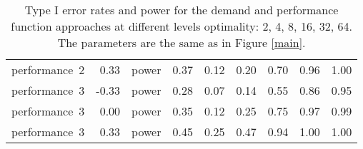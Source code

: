 \begin{table}[ht]
\begin{tabular}{lrlrrrrrr}
  performance~2 & 0.33 & power & 0.37 & 0.12 & 0.20 & 0.70 & 0.96 & 1.00 \\ 
  performance~3 & -0.33 & power & 0.28 & 0.07 & 0.14 & 0.55 & 0.86 & 0.95 \\ 
  performance~3 & 0.00 & power & 0.35 & 0.12 & 0.25 & 0.75 & 0.97 & 0.99 \\ 
  performance~3 & 0.33 & power & 0.45 & 0.25 & 0.47 & 0.94 & 1.00 & 1.00 \\ 
   \hline
\end{tabular}
\endgroup
\caption{Type I error rates and power for the demand and
             performance function approaches at different levels optimality:
             2, 4, 8, 16, 32, 64. The parameters are the same as in Figure
             \ref{main}.} 
\label{main-table}
\end{table}
